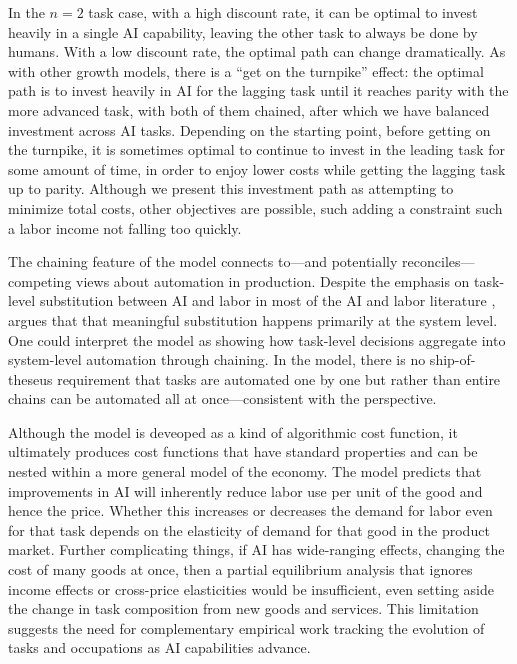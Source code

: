 \documentclass{article}
\theoremstyle{plain}
\theoremstyle{plain}
\begin{document}
In the $n = 2$ task case, with a high discount rate, it can be optimal to invest heavily in a single AI capability, leaving the other task to always be done by humans.
With a low discount rate, the optimal path can change dramatically. 
As with other growth models, there is a ``get on the turnpike'' effect: the optimal path is to invest heavily in AI for the lagging task until it reaches parity with the more advanced task, with both of them chained, after which we have balanced investment across AI tasks.
Depending on the starting point, before getting on the turnpike, it is sometimes optimal to continue to invest in the leading task for some amount of time, in order to enjoy lower costs while getting the lagging task up to parity.
Although we present this investment path as attempting to minimize total costs, other objectives are possible, such adding a constraint such a labor income not falling too quickly.

The chaining feature of the model connects to---and potentially reconciles---competing views about automation in production. 
Despite the emphasis on task-level substitution between AI and labor in most of the AI and labor literature \citep{autor2003skill, acemoglu2018automation}, \cite{bresnahan2002information} argues that that meaningful substitution happens primarily at the system level. 
One could interpret the model as showing how task-level decisions aggregate into system-level automation through chaining.
In the model, there is no ship-of-theseus requirement that tasks are automated one by one but rather than entire chains can be automated all at once---consistent with the \cite{bresnahan2002information} perspective.

Although the model is deveoped as a kind of algorithmic cost function, it ultimately produces cost functions that have standard properties and can be nested within a more general model of the economy. 
The model predicts that improvements in AI will inherently reduce labor use per unit of the good and hence the price.
Whether this increases or decreases the demand for labor even for that task depends on the elasticity of demand for that good in the product market.
Further complicating things, if AI has wide-ranging effects, changing the cost of many goods at once, then a partial equilibrium analysis that ignores income effects or cross-price elasticities would be insufficient, even setting aside the change in task composition from new goods and services.
This limitation suggests the need for complementary empirical work tracking the evolution of tasks and occupations as AI capabilities advance.
\end{document}
